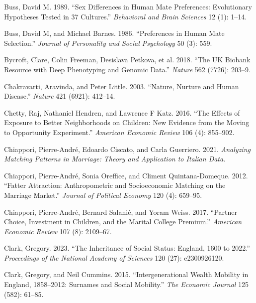 \documentclass[
  12pt,
]{article}
\newlength{\cslhangindent}
\newenvironment{CSLReferences}[2] %
 {\begin{list}{}{%
  \setlength{\itemindent}{0pt}
  \setlength{\leftmargin}{0pt}
  \setlength{\parsep}{0pt}
  \ifodd #1
   \setlength{\leftmargin}{\cslhangindent}
   \setlength{\itemindent}{-1\cslhangindent}
  \fi
  \setlength{\itemsep}{#2\baselineskip}}}
 {\end{list}}
\theoremstyle{definition}
\theoremstyle{definition}
\theoremstyle{definition}
\theoremstyle{definition}
\theoremstyle{remark}
\begin{document}
\begin{CSLReferences}{1}{1}
Buss, David M. 1989. {``Sex Differences in Human Mate Preferences: Evolutionary Hypotheses Tested in 37 Cultures.''} \emph{Behavioral and Brain Sciences} 12 (1): 1--14.

Buss, David M, and Michael Barnes. 1986. {``Preferences in Human Mate Selection.''} \emph{Journal of Personality and Social Psychology} 50 (3): 559.

{Bycroft, Clare, Colin Freeman, Desislava Petkova, et al.} 2018. {``The UK Biobank Resource with Deep Phenotyping and Genomic Data.''} \emph{Nature} 562 (7726): 203--9.

Chakravarti, Aravinda, and Peter Little. 2003. {``Nature, Nurture and Human Disease.''} \emph{Nature} 421 (6921): 412--14.

Chetty, Raj, Nathaniel Hendren, and Lawrence F Katz. 2016. {``The Effects of Exposure to Better Neighborhoods on Children: New Evidence from the Moving to Opportunity Experiment.''} \emph{American Economic Review} 106 (4): 855--902.

Chiappori, Pierre-André, Edoardo Ciscato, and Carla Guerriero. 2021. \emph{Analyzing Matching Patterns in Marriage: Theory and Application to Italian Data}.

Chiappori, Pierre-André, Sonia Oreffice, and Climent Quintana-Domeque. 2012. {``Fatter Attraction: Anthropometric and Socioeconomic Matching on the Marriage Market.''} \emph{Journal of Political Economy} 120 (4): 659--95.

Chiappori, Pierre-André, Bernard Salanié, and Yoram Weiss. 2017. {``Partner Choice, Investment in Children, and the Marital College Premium.''} \emph{American Economic Review} 107 (8): 2109--67.

Clark, Gregory. 2023. {``The Inheritance of Social Status: England, 1600 to 2022.''} \emph{Proceedings of the National Academy of Sciences} 120 (27): e2300926120.

Clark, Gregory, and Neil Cummins. 2015. {``Intergenerational Wealth Mobility in England, 1858--2012: Surnames and Social Mobility.''} \emph{The Economic Journal} 125 (582): 61--85.


\end{CSLReferences}
\end{document}
